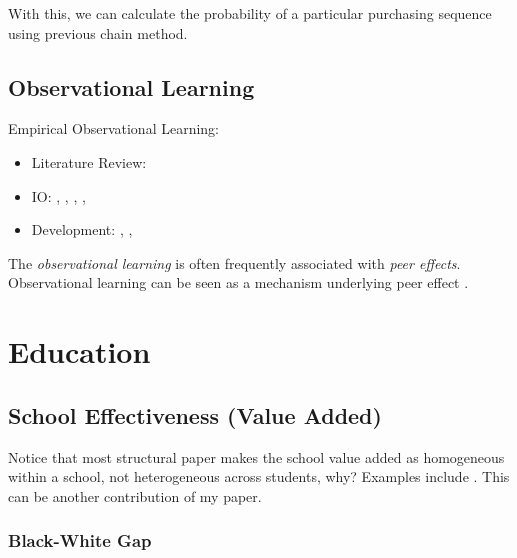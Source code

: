 With this, we can calculate the probability of a particular purchasing sequence using previous chain method.





\chapter{Observational Learning} %
\label{cha:observational_learning}

Empirical Observational Learning:
\begin{itemize}
    \item Literature Review: \textcite{Sorensen2017}
    \item IO: \textcite{Moretti2011}, \textcite{HendricksSorensenWiseman2012}, \textcite{Newberry2016}, \textcite{LiWu2019}, \textcite{HollenbeckMoorthyProserpio2019}
    \item Development: \textcite{BobonisFinan2009}, \textcite*{AngelucciDeGiorgiRangelEtAl2010}, \textcite*{BursztynEdererFermanEtAl2014}
\end{itemize}

The \textit{observational learning} is often frequently associated with \textit{peer effects}.
Observational learning can be seen as a mechanism underlying peer effect \citep{BursztynEdererFermanEtAl2014}.



\part{Education}

\chapter{School Effectiveness (Value Added)}

Notice that most structural paper makes the school value added as homogeneous within a school, not heterogeneous across students, why? 
Examples include \citet{Allende2019,Neilson2018}.
This can be another contribution of my paper.



\section{Black-White Gap} %
\label{sec:black_white_gap}

